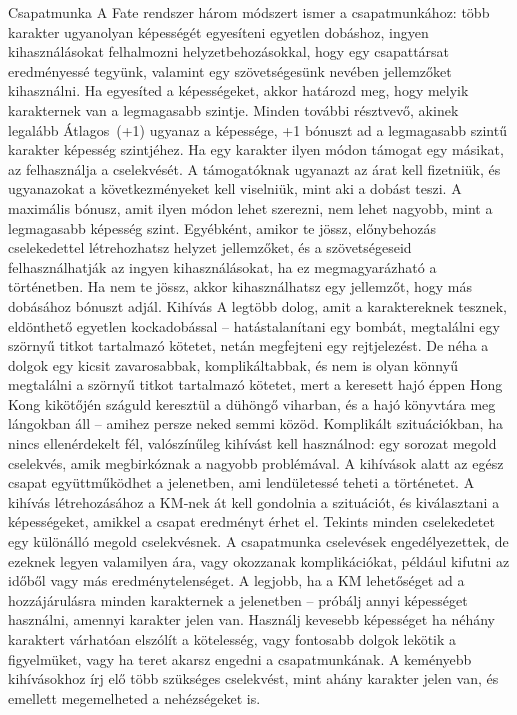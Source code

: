 \documentclass[oneside]{book}
\begin{document}
Csapatmunka
A Fate rendszer három módszert ismer a csapatmunkához: több karakter ugyanolyan képességét egyesíteni egyetlen dobáshoz, ingyen kihasználásokat felhalmozni helyzetbehozásokkal, hogy egy csapattársat eredményessé tegyünk, valamint egy szövetségesünk nevében jellemzőket kihasználni.
Ha egyesíted a képességeket, akkor határozd meg, hogy melyik karakternek van a legmagasabb szintje. Minden további résztvevő, akinek legalább Átlagos~(+1) ugyanaz a képessége, +1 bónuszt ad a legmagasabb szintű karakter képesség szintjéhez. Ha egy karakter ilyen módon támogat egy másikat, az felhasználja a cselekvését. A támogatóknak ugyanazt az árat kell fizetniük, és ugyanazokat a következményeket kell viselniük, mint aki a dobást teszi. A maximális bónusz, amit ilyen módon lehet szerezni, nem lehet nagyobb, mint a legmagasabb képesség szint.
Egyébként, amikor te jössz, előnybehozás cselekedettel létrehozhatsz helyzet jellemzőket, és a szövetségeseid felhasználhatják az ingyen kihasználásokat, ha ez megmagyarázható a történetben. Ha nem te jössz, akkor kihasználhatsz egy jellemzőt, hogy más dobásához bónuszt adjál.
Kihívás
A legtöbb dolog, amit a karaktereknek tesznek, eldönthető egyetlen kockadobással – hatástalanítani egy bombát, megtalálni egy szörnyű titkot tartalmazó kötetet, netán megfejteni egy rejtjelezést. De néha a dolgok egy kicsit zavarosabbak, komplikáltabbak, és nem is olyan könnyű megtalálni a szörnyű titkot tartalmazó kötetet, mert a keresett hajó éppen Hong Kong kikötőjén száguld keresztül a dühöngő viharban, és a hajó könyvtára meg lángokban áll – amihez persze neked semmi közöd.
Komplikált szituációkban, ha nincs ellenérdekelt fél, valószínűleg kihívást kell használnod: egy sorozat megold cselekvés, amik megbirkóznak a nagyobb problémával. A kihívások alatt az egész csapat együttműködhet a jelenetben, ami lendületessé teheti a történetet.
A kihívás létrehozásához a KM‑nek át kell gondolnia a szituációt, és kiválasztani a képességeket, amikkel a csapat eredményt érhet el. Tekints minden cselekedetet egy különálló megold cselekvésnek. A csapatmunka cselevések engedélyezettek, de ezeknek legyen valamilyen ára, vagy okozzanak komplikációkat, például kifutni az időből vagy más eredménytelenséget.
A legjobb, ha a KM lehetőséget ad a hozzájárulásra minden karakternek a jelenetben – próbálj annyi képességet használni, amennyi karakter jelen van. Használj kevesebb képességet ha néhány karaktert várhatóan elszólít a kötelesség, vagy fontosabb dolgok lekötik a figyelmüket, vagy ha teret akarsz engedni a csapatmunkának. A keményebb kihívásokhoz írj elő több szükséges cselekvést, mint ahány karakter jelen van, és emellett megemelheted a nehézségeket is.
\end{document}
